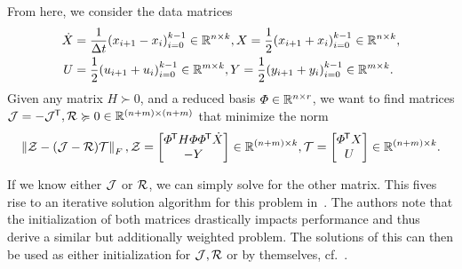 From here, we consider the data matrices
\begin{align*}
    \dot{X} &= \frac{1}{\Delta t} {\left( x_{i + 1} - x_i \right)}_{i = 0}^{k - 1} \in \bb{R}^{n \times k}, X = \frac{1}{2} {\left( x_{i + 1} + x_i \right)}_{i = 0}^{k - 1} \in \bb{R}^{n \times k}, \\
    U &= \frac{1}{2} {\left( u_{i + 1} + u_i \right)}_{i = 0}^{k - 1} \in \bb{R}^{m \times k}, Y = \frac{1}{2} {\left( y_{i + 1} + y_i \right)}_{i = 0}^{k - 1} \in \bb{R}^{m \times k}. \\
\end{align*}
Given any matrix $H \succ 0$, and a reduced basis $\varPhi \in \bb{R}^{n \times r}$, we want to find matrices $\mcl{J} = -\mcl{J}\trans, \mcl{R} \succcurlyeq 0 \in \bb{R}^{(n + m) \times (n + m)}$ that minimize the norm
\begin{equation}\label{eq:phdmd-lst-problem}
    \norm[F]{\mcl{Z} - (\mcl{J} - \mcl{R})\mcl{T}},
    \mcl{Z} =
    \begin{bmatrix}
        \varPhi\trans H \varPhi \varPhi\trans \dot{X} \\
        - Y
    \end{bmatrix} \in \bb{R}^{(n + m) \times k},
    \mcl{T} =
    \begin{bmatrix}
        \varPhi\trans X \\
        U
    \end{bmatrix} \in \bb{R}^{(n + m) \times k}.
\end{equation}

If we know either $\mcl{J}$ or $\mcl{R}$, we can simply solve for the other matrix.
This fives rise to an iterative solution algorithm for this problem in~\cite[Section~3.2]{Morandin2022}.
The authors note that the initialization of both matrices drastically impacts performance and thus derive a similar but additionally weighted problem.
The solutions of this can then be used as either initialization for $\mcl{J}, \mcl{R}$ or by themselves, cf.~\cite[Section~3.4]{Morandin2022}.